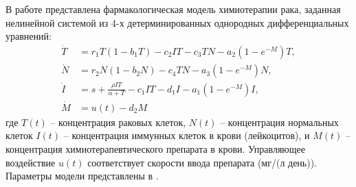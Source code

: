 В работе \cite{kuznetsov1994nonlinear} представлена фармакологическая модель химиотерапии рака, заданная нелинейной системой из 4-х детерминированных однородных дифференциальных уравнений:
\begin{equation}
\begin{split}
\dot T &= r_1T(1-b_1T) - c_2IT-c_3TN-a_2(1-e^{-M})T,\\
\dot N &= r_2N(1-b_2N) - c_4TN-a_3(1-e^{-M})N, \\
\dot I &= s + \frac{\rho IT}{\alpha + T} - c_1IT - d_1I - a_1(1-e^{-M})I, \\
\dot M &= u(t) - d_2M
\end{split}
\end{equation}
где $T(t)$ -- концентрация раковых клеток,  $N(t)$ -- концентрация нормальных клеток $I(t)$ -- концентрация иммунных клеток в крови (лейкоцитов), и $M(t)$ -- концентрация химиотерапевтического препарата в крови. Управляющее воздействие $u(t)$ соответствует скорости ввода препарата (мг/(л день)). Параметры модели представлены в .
%

